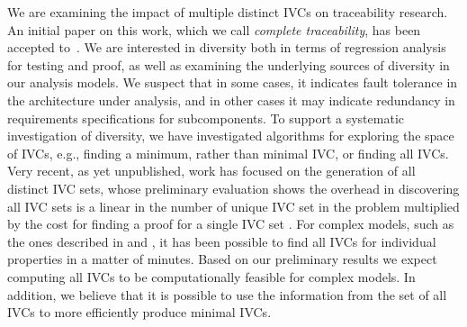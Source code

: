 We are examining the impact of multiple distinct IVCs on traceability
research.  An initial paper on this work, which we call {\em complete traceability},
has been accepted to~\cite{Murugesan16:renext}.  We are interested in diversity both
in terms of regression analysis for testing and proof, as well as examining
the underlying sources of diversity in our analysis models.  We suspect that
in some cases, it indicates fault tolerance in the architecture under analysis,
and in other cases it may indicate redundancy in requirements specifications
for subcomponents.  To support a systematic investigation of diversity, we
have investigated algorithms for exploring the space of IVCs, e.g., finding
a minimum, rather than minimal IVC, or finding all IVCs. Very recent, as yet unpublished, work has focused on the
generation of all distinct IVC sets, whose preliminary evaluation
shows the overhead in discovering all IVC sets is a linear in the
number of unique IVC set in the problem multiplied by the cost
for finding a proof for a single IVC set \cite{allIvcs}. For complex models, such
as the ones described in \cite {QFCS15:backes} and \cite{hilt2013}, it has been possible to
find all IVCs for individual properties in a matter of minutes.
Based on our preliminary results we expect computing all IVCs to be computationally feasible for complex models. In
addition, we believe that it is possible to use the information
from the set of all IVCs to more efficiently produce minimal
IVCs.